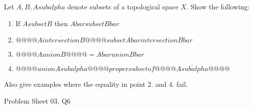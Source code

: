 \begin{samepage}
\begin{ex}
Let $A, B, A sub alpha$ denote subsets of a topological space $X$. Show the following:
\begin{enumerate}
\item If $A subset B$ then $A bar subset B bar$
\item $@@\overline{@@ A intersection B @@}@@ subset A bar intersection B bar$
\item $@@\overline{@@ A union B @@}@@ = A bar union B bar$
\item $@@\overline{@@ union A sub alpha @@}@@ proper subset of @@\overline{@@ A sub alpha @@}@@$
\end{enumerate}
Also give examples where the equality in point 2. and 4. fail.
\end{ex}
\begin{source}
Problem Sheet 03, Q6
\end{source}
\end{samepage}
